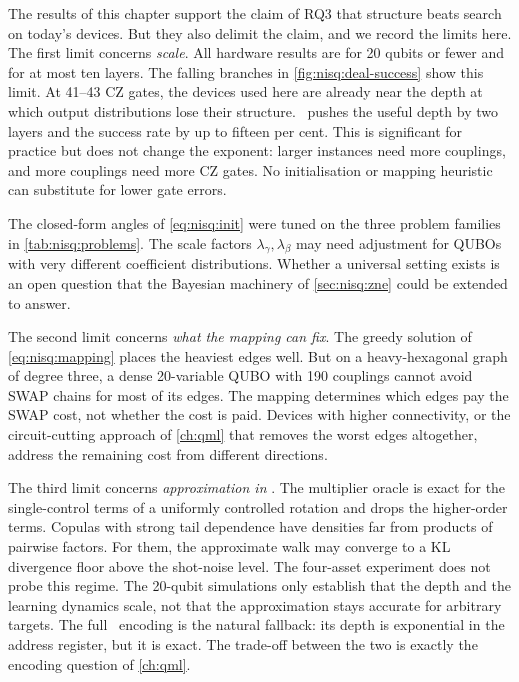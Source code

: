 The results of this chapter support the claim of RQ3 that structure beats search on today's devices. But they also delimit the claim, and we record the limits here. The first limit concerns \emph{scale}. All hardware results are for 20 qubits or fewer and for at most ten layers. The falling branches in \cref{fig:nisq:deal-success} show this limit. At 41--43 CZ gates, the devices used here are already near the depth at which output distributions lose their structure. \deal\ pushes the useful depth by two layers and the success rate by up to fifteen per cent. This is significant for practice but does not change the exponent: larger instances need more couplings, and more couplings need more CZ gates. No initialisation or mapping heuristic can substitute for lower gate errors.

The closed-form angles of \cref{eq:nisq:init} were tuned on the three problem families in \cref{tab:nisq:problems}. The scale factors $\lambda_{\gamma},\lambda_{\beta}$ may need adjustment for QUBOs with very different coefficient distributions. Whether a universal setting exists is an open question that the Bayesian machinery of \cref{sec:nisq:zne} could be extended to answer.

The second limit concerns \emph{what the mapping can fix}. The greedy solution of \cref{eq:nisq:mapping} places the heaviest edges well. But on a heavy-hexagonal graph of degree three, a dense 20-variable QUBO with 190 couplings cannot avoid SWAP chains for most of its edges. The mapping determines which edges pay the SWAP cost, not whether the cost is paid. Devices with higher connectivity, or the circuit-cutting approach of \cref{ch:qml} that removes the worst edges altogether, address the remaining cost from different directions.

The third limit concerns \emph{approximation in \qawa}. The multiplier oracle is exact for the single-control terms of a uniformly controlled rotation and drops the higher-order terms. Copulas with strong tail dependence have densities far from products of pairwise factors. For them, the approximate walk may converge to a KL divergence floor above the shot-noise level. The four-asset experiment does not probe this regime. The 20-qubit simulations only establish that the depth and the learning dynamics scale, not that the approximation stays accurate for arbitrary targets. The full \qcrank\ encoding is the natural fallback: its depth is exponential in the address register, but it is exact. The trade-off between the two is exactly the encoding question of \cref{ch:qml}.

